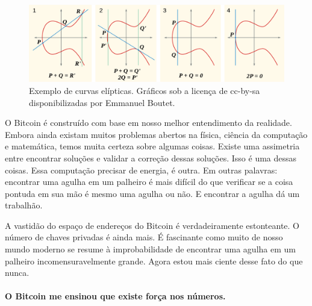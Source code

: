 \begin{figure}
  \includegraphics{assets/images/elliptic-curve-examples.png}
  \caption{Exemplo de curvas elípticas. Gráficos sob a licença de cc-by-sa disponibilizadas por Emmanuel Boutet.}
  \label{fig:elliptic-curve-examples}
\end{figure}

O Bitcoin é construído com base em nosso melhor entendimento da realidade. Embora ainda existam muitos problemas abertos na física, ciência da computação e matemática, temos muita certeza sobre algumas coisas. Existe uma assimetria entre encontrar soluções e validar a correção dessas soluções. Isso é uma dessas coisas. Essa computação precisar de energia, é outra. Em outras palavras: encontrar uma agulha em um palheiro é mais difícil do que verificar se a coisa pontuda em sua mão é mesmo uma agulha ou não. E encontrar a agulha dá um trabalhão.

A vastidão do espaço de endereços do Bitcoin é verdadeiramente estonteante. O número de chaves privadas é ainda mais. É fascinante como muito de nosso mundo moderno se resume à improbabilidade de encontrar uma agulha em um palheiro incomensuravelmente grande. Agora estou mais ciente desse fato do que nunca.

\paragraph{O Bitcoin me ensinou que existe força nos números.}

